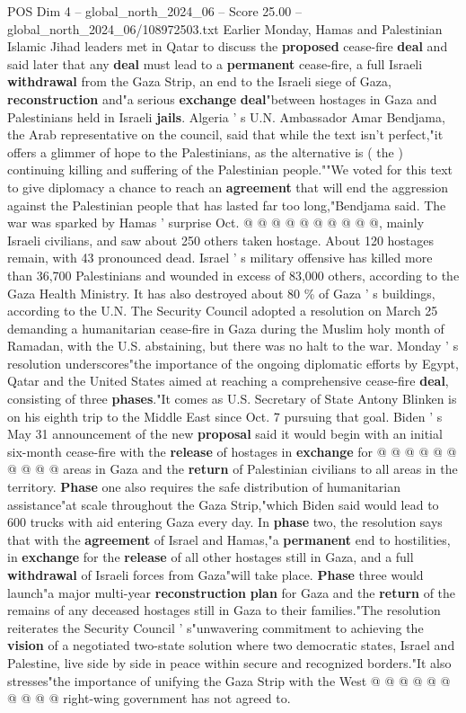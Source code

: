 \begin{textsample}{POS Dim 4 – global\_north\_2024\_06 – Score 25.00 – global\_north\_2024\_06/108972503.txt}
Earlier Monday, Hamas and Palestinian Islamic Jihad leaders met in Qatar to discuss the \textbf{proposed} cease-fire \textbf{deal} and said later that any \textbf{deal} must lead to a \textbf{permanent} cease-fire, a full Israeli \textbf{withdrawal} from the Gaza Strip, an end to the Israeli siege of Gaza, \textbf{reconstruction} and"a serious \textbf{exchange} \textbf{deal}"between hostages in Gaza and Palestinians held in Israeli \textbf{jails}.
Algeria ' s U.N.
Ambassador Amar Bendjama, the Arab representative on the council, said that while the text isn't perfect,"it offers a glimmer of hope to the Palestinians, as the alternative is ( the ) continuing killing and suffering of the Palestinian people.""We voted for this text to give diplomacy a chance to reach an \textbf{agreement} that will end the aggression against the Palestinian people that has lasted far too long,"Bendjama said.
The war was sparked by Hamas ' surprise Oct. @ @ @ @ @ @ @ @ @ @, mainly Israeli civilians, and saw about 250 others taken hostage.
About 120 hostages remain, with 43 pronounced dead.
Israel ' s military offensive has killed more than 36,700 Palestinians and wounded in excess of 83,000 others, according to the Gaza Health Ministry.
It has also destroyed about 80 \% of Gaza ' s buildings, according to the U.N.
The Security Council adopted a resolution on March 25 demanding a humanitarian cease-fire in Gaza during the Muslim holy month of Ramadan, with the U.S. abstaining, but there was no halt to the war.
Monday ' s resolution underscores"the importance of the ongoing diplomatic efforts by Egypt, Qatar and the United States aimed at reaching a comprehensive cease-fire \textbf{deal}, consisting of three \textbf{phases}."It comes as U.S.
Secretary of State Antony Blinken is on his eighth trip to the Middle East since Oct. 7 pursuing that goal.
Biden ' s May 31 announcement of the new \textbf{proposal} said it would begin with an initial six-month cease-fire with the \textbf{release} of hostages in \textbf{exchange} for @ @ @ @ @ @ @ @ @ @ areas in Gaza and the \textbf{return} of Palestinian civilians to all areas in the territory. \textbf{Phase} one also requires the safe distribution of humanitarian assistance"at scale throughout the Gaza Strip,"which Biden said would lead to 600 trucks with aid entering Gaza every day.
In \textbf{phase} two, the resolution says that with the \textbf{agreement} of Israel and Hamas,"a \textbf{permanent} end to hostilities, in \textbf{exchange} for the \textbf{release} of all other hostages still in Gaza, and a full \textbf{withdrawal} of Israeli forces from Gaza"will take place. \textbf{Phase} three would launch"a major multi-year \textbf{reconstruction} \textbf{plan} for Gaza and the \textbf{return} of the remains of any deceased hostages still in Gaza to their families."The resolution reiterates the Security Council ' s"unwavering commitment to achieving the \textbf{vision} of a negotiated two-state solution where two democratic states, Israel and Palestine, live side by side in peace within secure and recognized borders."It also stresses"the importance of unifying the Gaza Strip with the West @ @ @ @ @ @ @ @ @ @ right-wing government has not agreed to.


\end{textsample}

